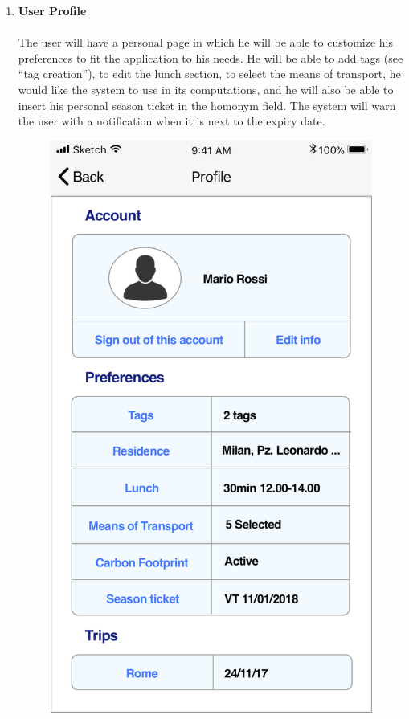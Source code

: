 \begin{enumerate}
	\item \textbf{User Profile}\\
			\vspace{0cm}\\
			The user will have a personal page in which he will be able to customize his preferences to fit the application to his needs. He will be able to add tags (see “tag creation”), to edit the lunch section, to select the means of transport, he would like the system to use in its computations, and he will also be able to insert his personal season ticket in the homonym field. 
			The system will warn the user with a notification when it is next to the expiry date. 
			\begin{figure}[H]
				\centering
				\includegraphics[scale=0.25]{Images/Sketch/User_Profile}

\end{figure}
\end{enumerate}
